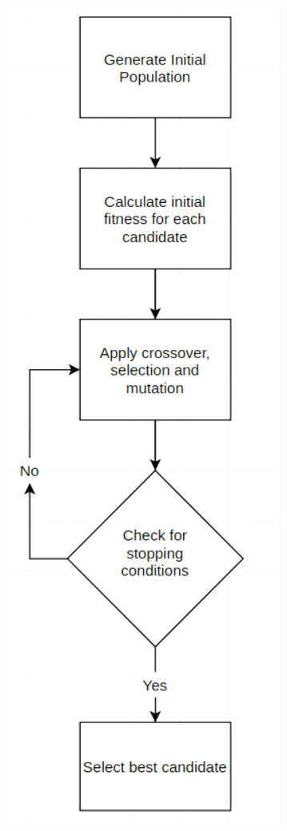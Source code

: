 \documentclass[conference]{IEEEtran}
\begin{document}
\begin{figure}[t]
	\centering
	\begin{subfigure}{.16\textwidth}
		\includegraphics[width=\textwidth]{ga.png}
		

\end{subfigure}
\end{figure}
\end{document}
